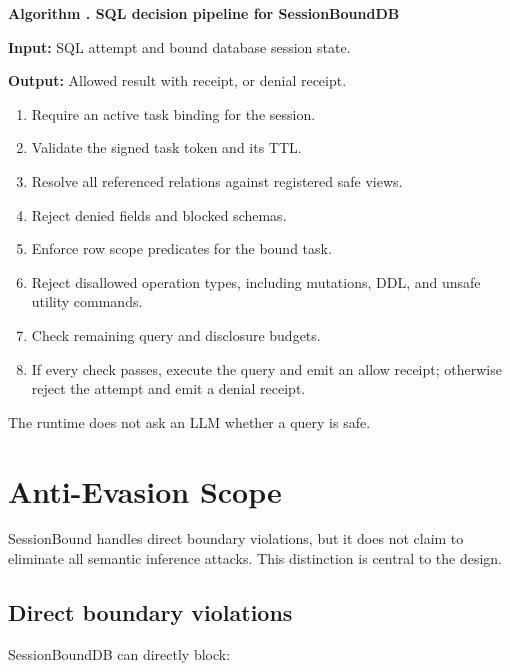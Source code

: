 \documentclass[
]{article}
\newcounter{algorithm}
\begin{document}
\begin{center}
\label{alg:sql-decision-pipeline}
\begin{minipage}{0.9\linewidth}
\textbf{Algorithm \thealgorithm. SQL decision pipeline for SessionBoundDB}

\textbf{Input:} SQL attempt and bound database session state.

\textbf{Output:} Allowed result with receipt, or denial receipt.

\begin{enumerate}
\item Require an active task binding for the session.
\item Validate the signed task token and its TTL.
\item Resolve all referenced relations against registered safe views.
\item Reject denied fields and blocked schemas.
\item Enforce row scope predicates for the bound task.
\item Reject disallowed operation types, including mutations, DDL, and
unsafe utility commands.
\item Check remaining query and disclosure budgets.
\item If every check passes, execute the query and emit an allow receipt;
otherwise reject the attempt and emit a denial receipt.
\end{enumerate}
\end{minipage}
\end{center}

The runtime does not ask an LLM whether a query is safe.


\hypertarget{anti-evasion-scope}{%
\section{Anti-Evasion Scope}\label{anti-evasion-scope}}

SessionBound handles direct boundary violations, but it does not claim
to eliminate all semantic inference attacks. This distinction is central
to the design.

\hypertarget{direct-boundary-violations}{%
\subsection{Direct boundary
violations}\label{direct-boundary-violations}}

SessionBoundDB can directly block:
\end{document}
